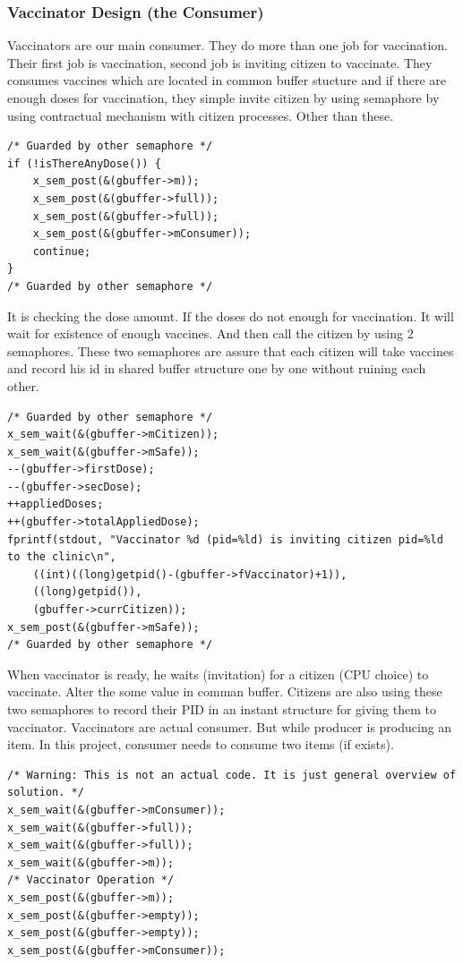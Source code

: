 \documentclass{article}
\begin{document}
\subsubsection{Vaccinator Design (the Consumer)}
Vaccinators are our main consumer. They do more than one job for vaccination. Their first job is vaccination, second job is inviting citizen to vaccinate. They consumes vaccines which are located in common buffer stucture and if there are enough doses for vaccination, they simple invite citizen by using semaphore by using contractual mechanism with citizen processes. Other than these.
\begin{lstlisting}[style=CStyle]
/* Guarded by other semaphore */
if (!isThereAnyDose()) {
    x_sem_post(&(gbuffer->m));
    x_sem_post(&(gbuffer->full));
    x_sem_post(&(gbuffer->full));
    x_sem_post(&(gbuffer->mConsumer));
    continue;
}
/* Guarded by other semaphore */
\end{lstlisting}
It is checking the dose amount. If the doses do not enough for vaccination. It will wait for existence of enough vaccines. And then call the citizen by using 2 semaphores. These two semaphores are assure that each citizen will take vaccines and record his id in shared buffer structure one by one without ruining each other.
\begin{lstlisting}[style=CStyle]
/* Guarded by other semaphore */
x_sem_wait(&(gbuffer->mCitizen));
x_sem_wait(&(gbuffer->mSafe));
--(gbuffer->firstDose);
--(gbuffer->secDose);
++appliedDoses;
++(gbuffer->totalAppliedDose);
fprintf(stdout, "Vaccinator %d (pid=%ld) is inviting citizen pid=%ld to the clinic\n",
    ((int)((long)getpid()-(gbuffer->fVaccinator)+1)),
    ((long)getpid()),
    (gbuffer->currCitizen));
x_sem_post(&(gbuffer->mSafe));
/* Guarded by other semaphore */
\end{lstlisting}
When vaccinator is ready, he waits (invitation) for a citizen (CPU choice) to vaccinate. Alter the some value in comman buffer. Citizens are also using these two semaphores to record their PID in an instant structure for giving them to vaccinator. Vaccinators are actual consumer. But while producer is producing an item. In this project, consumer needs to consume two items (if exists).
\begin{lstlisting}[style=CStyle]
/* Warning: This is not an actual code. It is just general overview of solution. */
x_sem_wait(&(gbuffer->mConsumer));
x_sem_wait(&(gbuffer->full));
x_sem_wait(&(gbuffer->full));
x_sem_wait(&(gbuffer->m));
/* Vaccinator Operation */
x_sem_post(&(gbuffer->m));
x_sem_post(&(gbuffer->empty));
x_sem_post(&(gbuffer->empty));
x_sem_post(&(gbuffer->mConsumer));
\end{lstlisting}
\end{document}
